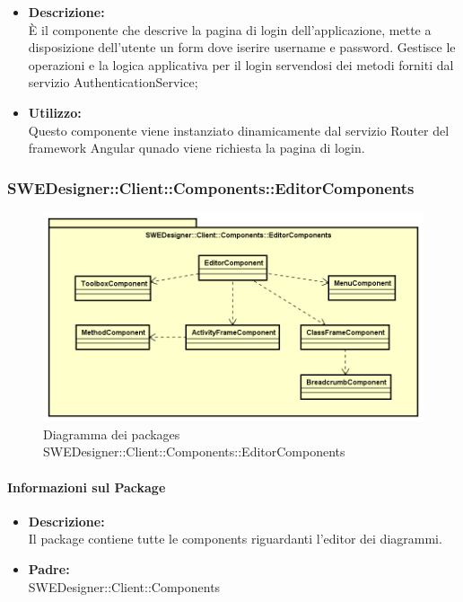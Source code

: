 \begin{itemize}
			\begin{itemize}
				\item \textbf{Descrizione: }\\
				È il componente che descrive la pagina di login dell'applicazione,
				mette a disposizione dell'utente un form dove iserire username e password.
				Gestisce le operazioni e la logica applicativa per il login servendosi dei
				metodi forniti dal servizio AuthenticationService;
				\item \textbf{Utilizzo: }\\
				Questo componente viene instanziato dinamicamente dal servizio Router del
				framework Angular qunado viene richiesta la pagina di login.
			\end{itemize}
		\end{itemize}

		\subsubsection{SWEDesigner::Client::Components::EditorComponents}
		 \begin{figure}[h!]
		\centering
		\includegraphics[scale=0.4]{Disegnetti/SWEDesigner__Client__Components__EditorComponents.png}
		\caption{Diagramma dei packages SWEDesigner::Client::Components::EditorComponents}
 		\end{figure}
		\paragraph{Informazioni sul Package}
		\begin{itemize}
			\item \textbf{Descrizione: }\\
			Il package contiene tutte le components riguardanti l'editor dei diagrammi.
			\item \textbf{Padre: }\\ SWEDesigner::Client::Components
		\end{itemize}

